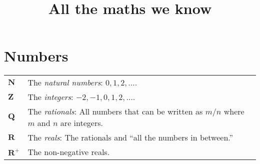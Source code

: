 \documentclass[10pt, a4paper, twocolumn]{article}
\title{All the maths we know}
\date{}
\author{}
\newcommand{\set}[1]{\mathbold{#1}}
\begin{document}
\maketitle
\section{Numbers}
\begin{tabularx}{\columnwidth}{@{}p{}X@{}}
  \toprule
  $\set{N}$ & The \emph{natural numbers}: $0, 1, 2, \dotsc$. \\
  $\set{Z}$ & The \emph{integers}: $-2, -1, 0, 1, 2, \dotsc$. \\
  $\set{Q}$ & The \emph{rationals}: All numbers that can be written
  as $m/n$ where $m$ and $n$ are integers. \\
  $\set{R}$ & The \emph{reals}: The rationals and ``all the numbers in
  between.'' \\
  $\set{R}^+$ & The non-negative reals. \\
\end{tabularx}
\end{document}
